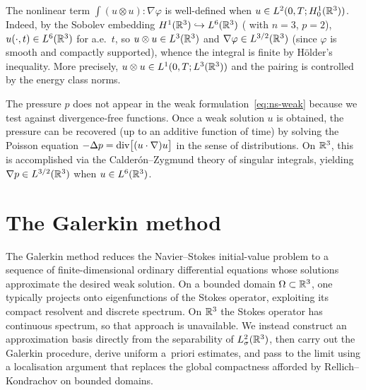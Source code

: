 \begin{remark}\label{rem:nonlinear-welldefined}
  The nonlinear term $\int (u \otimes u) : \nabla \varphi$ is well-defined when
  $u \in L^{2}(0, T; H^{1}_0(\mathbb{R}^{3}))$.  Indeed, by the Sobolev embedding
  $H^{1}(\mathbb{R}^{3}) \hookrightarrow L^{6}(\mathbb{R}^{3})$ (
  with $n = 3$, $p = 2$), $u(\cdot, t) \in L^{6}(\mathbb{R}^{3})$ for a.e.\ $t$, so
  $u \otimes u \in L^{3}(\mathbb{R}^{3})$ and
  $\nabla \varphi \in L^{3/2}(\mathbb{R}^{3})$ (since $\varphi$ is smooth and compactly
  supported), whence the integral is finite by H\"{o}lder's inequality.  More precisely,
  $u \otimes u \in L^{1}(0, T; L^{3}(\mathbb{R}^{3}))$ and the pairing is controlled by the
  energy class norms.
\end{remark}

\begin{remark}
  The pressure $p$ does not appear in the weak formulation~\eqref{eq:ns-weak} because
  we test against divergence-free functions.  Once a weak solution $u$ is obtained, the
  pressure can be recovered (up to an additive function of time) by solving the Poisson
  equation $-\Delta p = \operatorname{div}\bigl[(u \cdot \nabla) u\bigr]$ in the sense of
  distributions.  On $\mathbb{R}^{3}$, this is accomplished via the Calder\'{o}n--Zygmund theory
  of singular integrals, yielding $\nabla p \in L^{3/2}(\mathbb{R}^{3})$ when $u \in
  L^{6}(\mathbb{R}^{3})$.
\end{remark}

\section{The Galerkin method}\label{sec:galerkin}

The Galerkin method reduces the Navier--Stokes initial-value problem to a
sequence of finite-dimensional ordinary differential equations whose solutions
approximate the desired weak solution.  On a bounded domain
$\Omega \subset \mathbb{R}^{3}$, one typically projects onto eigenfunctions of the Stokes
operator, exploiting its compact resolvent and discrete spectrum.  On $\mathbb{R}^{3}$ the
Stokes operator has continuous spectrum, so that approach is unavailable.  We
instead construct an approximation basis directly from the separability of
$L^{2}_\sigma(\mathbb{R}^{3})$, then carry out the Galerkin procedure, derive uniform a~priori
estimates, and pass to the limit using a localisation argument that replaces the
global compactness afforded by Rellich--Kondrachov on bounded domains.

